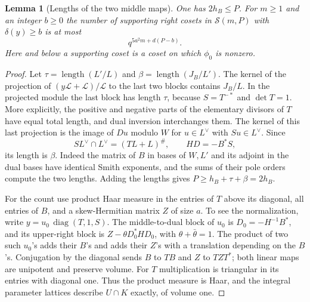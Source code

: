 \documentclass[a4paper,11pt]{article}
\newtheorem{lemma}[proposition]{Lemma}
\theoremstyle{definition}
\theoremstyle{remark}
\numberwithin{equation}{section}
\begin{document}
\begin{lemma}[Lengths of the two middle maps]
\leavevmode\label{lem:inertmiddle902}
One has \(2h_B\le P\). For \(m\ge1\) and an integer \(b\ge0\)
the number of supporting right cosets in \(\mathcal S(m,P)\) with
\(\delta(y)\ge b\) is at most
\begin{equation}
                         q^{5a^2m+d(P-b)}.
 \label{eq:inertmiddle902}
\end{equation}
Here and below a supporting coset is a coset on which \(\phi_0\)
is nonzero.
\end{lemma}
\begin{proof}
Let \(\tau=\operatorname{length}(L'/L)\) and
\(\beta=\operatorname{length}(J_B/L')\). The kernel of the
projection of \((y\mathcal L+\mathcal L)/\mathcal L\) to the
last two blocks contains \(J_B/L\). In the projected module
the last block has length \(\tau\), because \(S=T^{-*}\)
and \(\det T=1\). More explicitly, the positive and negative
parts of the elementary divisors of \(T\) have equal total
length, and dual inversion interchanges them. The kernel of
this last projection is the image of \(Du\) modulo \(W\)
for \(u\in L^\vee\) with \(Su\in L^\vee\). Since
\[
 S L^\vee\cap L^\vee=(T L+L)^\#,\qquad HD=-B^*S,
\]
its length is \(\beta\). Indeed the matrix of \(B\) in bases of
\(W,L'\) and its adjoint in the dual bases have identical Smith
exponents, and the sums of their pole orders compute the two
lengths. Adding the lengths gives
\(P\ge h_B+\tau+\beta=2h_B\).

For the count use product Haar measure in the entries of \(T\)
above its diagonal, all entries of \(B\), and a skew-Hermitian
matrix \(Z\) of size \(a\). To see the normalization, write
\(y=u_0\,\operatorname{diag}(T,1,S)\). The middle-to-dual block
of \(u_0\) is \(D_0=-H^{-1}B^*\), and its upper-right block is
\(Z-\theta D_0^*HD_0\), with \(\theta+\bar\theta=1\).
The product of two such \(u_0\)'s adds their \(B\)'s and adds
their \(Z\)'s with a translation depending on the \(B\)'s.
Conjugation by the diagonal sends \(B\) to \(TB\) and \(Z\)
to \(TZT^*\); both linear maps are unipotent and preserve volume.
For \(T\) multiplication is triangular in its entries with
diagonal one. Thus the product measure is Haar, and the integral
parameter lattices describe \(U\cap K\) exactly, of volume one.


\end{proof}
\end{document}
